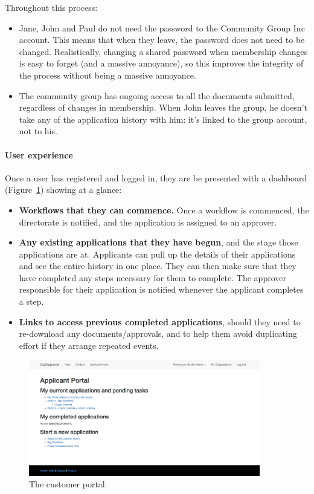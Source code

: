 \documentclass[12pt,a4paper,twosided]{article}
\begin{document}
Throughout this process:
\begin{itemize}
\item Jane, John and Paul do not need the password to the Community Group Inc account. This means that when they leave, the password does not need to be changed. Realistically, changing a shared password when membership changes is easy to forget (and a massive annoyance), so this improves the integrity of the process without being a massive annoyance.
\item The community group has ongoing access to all the documents submitted, regardless of changes in membership. When John leaves the group, he doesn't take any of the application history with him: it's linked to the group account, not to his.
\end{itemize}

\paragraph{User experience}

Once a user has registered and logged in, they are be presented with a
dashboard (Figure~\ref{fig:customer-portal}) showing at a glance:

\begin{itemize}

\item
  \textbf{Workflows that they can commence.} Once a workflow is
  commenced, the directorate is notified, and the application is
  assigned to an approver.
\item
  \textbf{Any existing applications that they have begun}, and the stage
  those applications are at. Applicants can pull up the details of their
  applications and see the entire history in one place. They can then
  make sure that they have completed any steps necessary for them to
  complete. The approver responsible for their application is notified
  whenever the applicant completes a step.
\item
  \textbf{Links to access previous completed applications}, should they
  need to re-download any documents/approvals, and to help them avoid
  duplicating effort if they arrange repeated events.
\end{itemize}

\begin{figure}[H]
  \centering
  \includegraphics[width=0.9\textwidth]{customer-portal.png}
  \caption{The customer portal.}
  \label{fig:customer-portal}
\end{figure}
\end{document}
